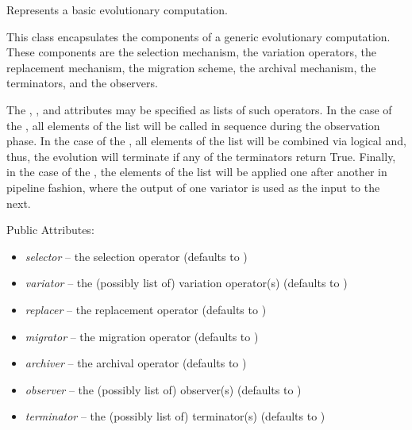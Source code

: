 \documentclass[letterpaper,10pt,english]{sphinxmanual}
\begin{document}
\begin{fulllineitems}
\label{reference:inspyred.ec.EvolutionaryComputation}
Represents a basic evolutionary computation.

This class encapsulates the components of a generic evolutionary
computation. These components are the selection mechanism, the
variation operators, the replacement mechanism, the migration
scheme, the archival mechanism, the terminators, and the observers.

The , , and  attributes may be
specified as lists of such operators. In the case of the ,
all elements of the list will be called in sequence during the 
observation phase. In the case of the , all elements of
the list will be combined via logical  and, thus, the evolution will 
terminate if any of the terminators return True. Finally, in the case
of the , the elements of the list will be applied one
after another in pipeline fashion, where the output of one variator
is used as the input to the next.

Public Attributes:
\begin{itemize}
\item {} 
\emph{selector} -- the selection operator (defaults to )

\item {} 
\emph{variator} -- the (possibly list of) variation operator(s) (defaults to 
)

\item {} 
\emph{replacer} -- the replacement operator (defaults to 
)

\item {} 
\emph{migrator} -- the migration operator (defaults to )

\item {} 
\emph{archiver} -- the archival operator (defaults to )

\item {} 
\emph{observer} -- the (possibly list of) observer(s) (defaults to 
)

\item {} 
\emph{terminator} -- the (possibly list of) terminator(s) (defaults to 
)


\end{itemize}
\end{fulllineitems}
\end{document}
